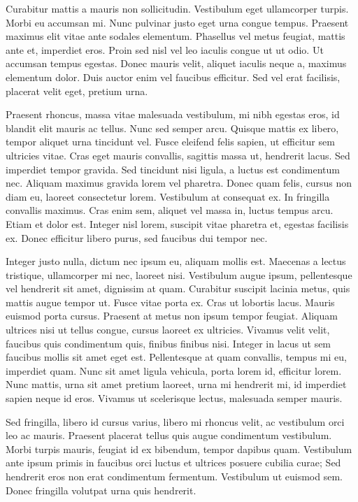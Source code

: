 Curabitur mattis a mauris non sollicitudin. Vestibulum eget ullamcorper turpis. Morbi eu accumsan mi. Nunc pulvinar justo eget urna congue tempus. Praesent maximus elit vitae ante sodales elementum. Phasellus vel metus feugiat, mattis ante et, imperdiet eros. Proin sed nisl vel leo iaculis congue ut ut odio. Ut accumsan tempus egestas. Donec mauris velit, aliquet iaculis neque a, maximus elementum dolor. Duis auctor enim vel faucibus efficitur. Sed vel erat facilisis, placerat velit eget, pretium urna.

Praesent rhoncus, massa vitae malesuada vestibulum, mi nibh egestas eros, id blandit elit mauris ac tellus. Nunc sed semper arcu. Quisque mattis ex libero, tempor aliquet urna tincidunt vel. Fusce eleifend felis sapien, ut efficitur sem ultricies vitae. Cras eget mauris convallis, sagittis massa ut, hendrerit lacus. Sed imperdiet tempor gravida. Sed tincidunt nisi ligula, a luctus est condimentum nec. Aliquam maximus gravida lorem vel pharetra. Donec quam felis, cursus non diam eu, laoreet consectetur lorem. Vestibulum at consequat ex. In fringilla convallis maximus. Cras enim sem, aliquet vel massa in, luctus tempus arcu. Etiam et dolor est. Integer nisl lorem, suscipit vitae pharetra et, egestas facilisis ex. Donec efficitur libero purus, sed faucibus dui tempor nec.

Integer justo nulla, dictum nec ipsum eu, aliquam mollis est. Maecenas a lectus tristique, ullamcorper mi nec, laoreet nisi. Vestibulum augue ipsum, pellentesque vel hendrerit sit amet, dignissim at quam. Curabitur suscipit lacinia metus, quis mattis augue tempor ut. Fusce vitae porta ex. Cras ut lobortis lacus. Mauris euismod porta cursus. Praesent at metus non ipsum tempor feugiat. Aliquam ultrices nisi ut tellus congue, cursus laoreet ex ultricies. Vivamus velit velit, faucibus quis condimentum quis, finibus finibus nisi. Integer in lacus ut sem faucibus mollis sit amet eget est. Pellentesque at quam convallis, tempus mi eu, imperdiet quam. Nunc sit amet ligula vehicula, porta lorem id, efficitur lorem. Nunc mattis, urna sit amet pretium laoreet, urna mi hendrerit mi, id imperdiet sapien neque id eros. Vivamus ut scelerisque lectus, malesuada semper mauris.

Sed fringilla, libero id cursus varius, libero mi rhoncus velit, ac vestibulum orci leo ac mauris. Praesent placerat tellus quis augue condimentum vestibulum. Morbi turpis mauris, feugiat id ex bibendum, tempor dapibus quam. Vestibulum ante ipsum primis in faucibus orci luctus et ultrices posuere cubilia curae; Sed hendrerit eros non erat condimentum fermentum. Vestibulum ut euismod sem. Donec fringilla volutpat urna quis hendrerit.

